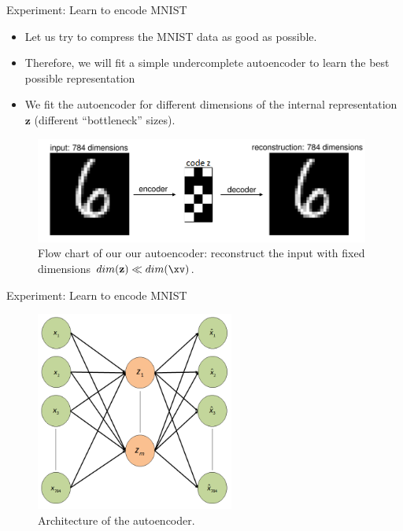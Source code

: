 \begin{frame}{Experiment: Learn to encode MNIST}
  \begin{itemize}
    \item Let us try to compress the MNIST data as good as possible.
    \item Therefore, we will fit a simple undercomplete autoencoder to learn the best possible representation 
    \item We fit the autoencoder for different dimensions of the internal representation $\mathbf{z}$ (different \enquote{bottleneck} sizes).
  \end{itemize}
  \begin{figure}
    \centering
    \includegraphics[width=11cm]{plots/autoencoder_mnist_problem.png}
    \caption{Flow chart of our our autoencoder: reconstruct the input with fixed dimensions $dim(\mathbf{z}) \ll dim(\xv)$.}
  \end{figure}
\end{frame}
\begin{frame}{Experiment: Learn to encode MNIST}
  \begin{figure}
    \centering
    \includegraphics[width=6.5cm]{plots/autoencoder_mnist_example.png}
    \caption{Architecture of the autoencoder.}
  \end{figure}
\end{frame}

